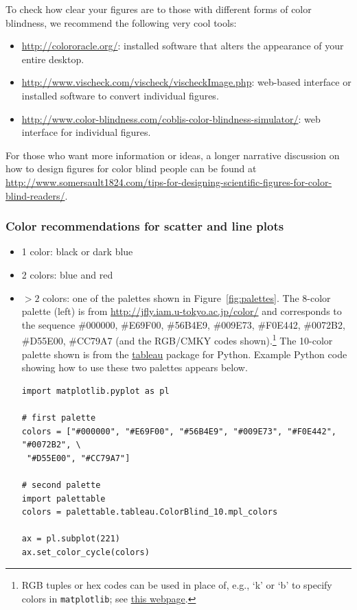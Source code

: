 \documentclass[letterpaper,11pt]{article}
\begin{document}
To check how clear your figures are to those with different forms of color blindness, we recommend the following very cool tools:
\begin{itemize}
\item \url{http://colororacle.org/}: installed software that alters the appearance of your entire desktop.
\item \url{http://www.vischeck.com/vischeck/vischeckImage.php}: web-based interface or installed software to convert individual figures.
\item \url{http://www.color-blindness.com/coblis-color-blindness-simulator/}: web interface for individual figures.
\end{itemize}

For those who want more information or ideas, a longer narrative discussion on how to design figures for color blind people can be found at \\ \url{http://www.somersault1824.com/tips-for-designing-scientific-figures-for-color-blind-readers/}.

\subsubsection{Color recommendations for scatter and line plots}

\begin{itemize}
\item 1 color: black or dark blue
\item 2 colors: blue and red
\item $>2$ colors: one of the palettes shown in Figure~\ref{fig:palettes}. The 8-color palette (left) is from \url{http://jfly.iam.u-tokyo.ac.jp/color/} and corresponds to the sequence \#000000, \#E69F00, \#56B4E9, \#009E73, \#F0E442, \#0072B2, \#D55E00, \#CC79A7 (and the RGB/CMKY codes shown).\footnote{RGB tuples or hex codes can be used in place of, e.g., `k' or `b' to specify colors in {\tt matplotlib}; see \href{https://matplotlib.org/users/colors.html}{this webpage}.} The 10-color palette shown is from the \href {https://jiffyclub.github.io/palettable/tableau/}{tableau} package for Python. Example Python code showing how to use these two palettes appears below.
\begin{verbatim}
import matplotlib.pyplot as pl

# first palette
colors = ["#000000", "#E69F00", "#56B4E9", "#009E73", "#F0E442", "#0072B2", \
 "#D55E00", "#CC79A7"]

# second palette
import palettable
colors = palettable.tableau.ColorBlind_10.mpl_colors

ax = pl.subplot(221)
ax.set_color_cycle(colors)
\end{verbatim}
\end{itemize}
\end{document}
